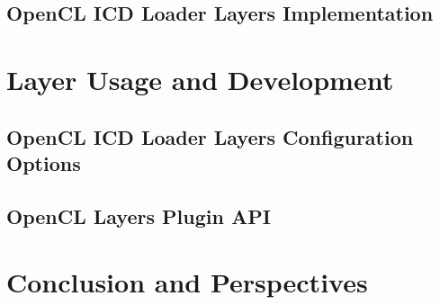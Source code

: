 \documentclass{beamer}
\begin{document}
\subsection[Implementation]{OpenCL ICD Loader Layers Implementation}


\section{Layer Usage and Development}
\subsection[configuration]{OpenCL ICD Loader Layers Configuration Options}


\subsection[Layer API]{OpenCL Layers Plugin API}


\section[Conclusion]{Conclusion and Perspectives}

\end{document}
